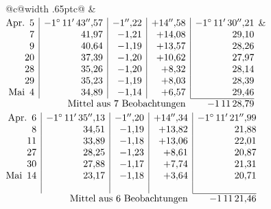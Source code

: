 \noindent\begin{tabular}{@{}c@{\hspace{.4em}\vrule width .65pt\hspace{.4em}}c@{}}
 &
 \\[.18ex]
\(\begin{array}[t]{@{}r|r|r|r|r@{}}
\text{Apr.}\enspace 5 & -1^\circ\,11'\,43''{,}57 & -1''{,}22 & +14''{,}58 & -1^\circ\,11'\,30''{,}21\\
7 & 41{,}97 & -1{,}21 & +14{,}08 & 29{,}10\\
9 & 40{,}64 & -1{,}19 & +13{,}57 & 28{,}26\\
20 & 37{,}39 & -1{,}20 & +10{,}62 & 27{,}97\\
28 & 35{,}26 & -1{,}20 & +8{,}32 & 28{,}14\\
29 & 35{,}23 & -1{,}19 & +8{,}03 & 28{,}39\\
\text{Mai}\enspace 4 & 34{,}89 & -1{,}14 & +6{,}57 & 29{,}46\\
\cline{5-5}
\multicolumn{4}{r}{\text{Mittel aus 7 Beobachtungen}} & -1\,11\,28{,}79
\end{array}\)
&
\(\begin{array}[t]{@{}r|r|r|r|r@{}}
\text{Apr.}\enspace 6 & -1^\circ\,11'\,35''{,}13 & -1''{,}20 & +14''{,}34 & -1^\circ\,11'\,21''{,}99\\
8 & 34{,}51 & -1{,}19 & +13{,}82 & 21{,}88\\
11 & 33{,}89 & -1{,}18 & +13{,}06 & 22{,}01\\
27 & 28{,}25 & -1{,}23 & +8{,}61 & 20{,}87\\
30 & 27{,}88 & -1{,}17 & +7{,}74 & 21{,}31\\
\text{Mai}\enspace 14 & 23{,}17 & -1{,}18 & +3{,}64 & 20{,}71\\
 & & & & \\
\cline{5-5}
\multicolumn{4}{r}{\text{Mittel aus 6 Beobachtungen}} & -1\,11\,21{,}46
\end{array}\)
\end{tabular}\par\medskip
